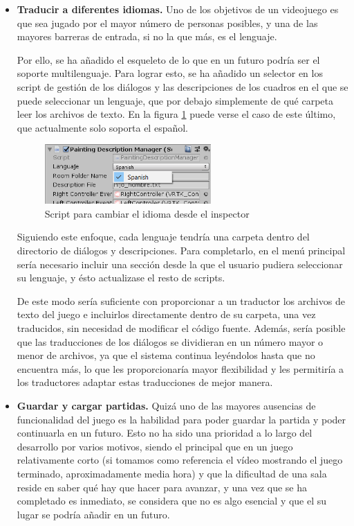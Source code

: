 \begin{itemize}
    \item \textbf{Traducir a diferentes idiomas.} Uno de los objetivos de un videojuego es que sea jugado por el mayor número de personas posibles, y una de las mayores barreras de entrada, si no la que más, es el lenguaje. 
    
    Por ello, se ha añadido el esqueleto de lo que en un futuro podría ser el soporte multilenguaje. Para lograr esto, se ha añadido un selector en los script de gestión de los diálogos y las descripciones de los cuadros en el que se puede seleccionar un lenguaje, que por debajo simplemente de qué carpeta leer los archivos de texto. En la figura \ref{fig:languaje-selector} puede verse el caso de este último, que actualmente solo soporta el español.

    \begin{figure}[!h]
    \begin{center}
    \includegraphics[width=0.6\textwidth]{imagenes/8/languaje-selector.png}
    \caption{Script para cambiar el idioma desde el inspector}
    \label{fig:languaje-selector}
    \end{center}
    \end{figure}

    Siguiendo este enfoque, cada lenguaje tendría una carpeta dentro del directorio de diálogos y descripciones. Para completarlo, en el menú principal sería necesario incluir una sección desde la que el usuario pudiera seleccionar su lenguaje, y ésto actualizase el resto de scripts.
    
    De este modo sería suficiente con proporcionar a un traductor los archivos de texto del juego e incluirlos directamente dentro de su carpeta, una vez traducidos, sin necesidad de modificar el código fuente. Además, sería posible que las traducciones de los diálogos se dividieran en un número mayor o menor de archivos, ya que el sistema continua leyéndolos hasta que no encuentra más, lo que les proporcionaría mayor flexibilidad y les permitiría a los traductores adaptar estas traducciones de mejor manera.

    \item \textbf{Guardar y cargar partidas.} Quizá uno de las mayores ausencias de funcionalidad del juego es la habilidad para poder guardar la partida y poder continuarla en un futuro. Esto no ha sido una prioridad a lo largo del desarrollo por varios motivos, siendo el principal que en un juego relativamente corto (si tomamos como referencia el vídeo mostrando el juego terminado, aproximadamente media hora) y que la dificultad de una sala reside en saber qué hay que hacer para avanzar, y una vez que se ha completado es inmediato, se considera que no es algo esencial y que el su lugar se podría añadir en un futuro.
    

\end{itemize}
